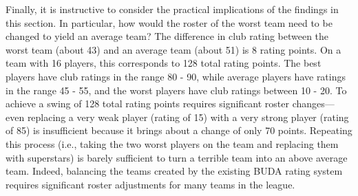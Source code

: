 Finally, it is instructive to consider the practical implications of the findings in this section. In particular, how would the roster of the worst team need to be changed to yield an average team? The difference in club rating between the worst team (about 43) and an average team (about 51) is 8 rating points. On a team with 16 players, this corresponds to 128 total rating points. The best players have club ratings in the range 80 - 90, while average players have ratings in the range 45 - 55, and the worst players have club ratings between 10 - 20. To achieve a swing of 128 total rating points requires significant roster changes---even replacing a very weak player (rating of 15) with a very strong player (rating of 85) is insufficient because it brings about a change of only 70 points. Repeating this process (i.e., taking the two worst players on the team and replacing them with superstars) is barely sufficient to turn a terrible team into an above average team. Indeed, balancing the teams created by the existing BUDA rating system requires significant roster adjustments for many teams in the league. 
